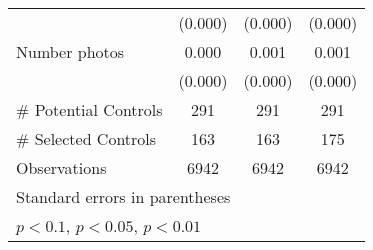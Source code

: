{\begin{tabular}{l*{3}{c}}
                    &     (0.000)         &     (0.000)         &     (0.000)         \\
[1em]
Number photos       &       0.000\sym{***}&       0.001\sym{***}&       0.001\sym{***}\\
                    &     (0.000)         &     (0.000)         &     (0.000)         \\
\hline
# Potential Controls&         291         &         291         &         291         \\
# Selected Controls &         163         &         163         &         175         \\
Observations        &        6942         &        6942         &        6942         \\
\hline\hline
\multicolumn{4}{l}{\footnotesize Standard errors in parentheses}\\
\multicolumn{4}{l}{\footnotesize \sym{*} \(p<0.1\), \sym{**} \(p<0.05\), \sym{***} \(p<0.01\)}\\
\end{tabular}
}
